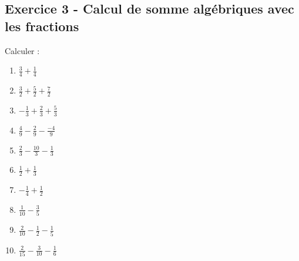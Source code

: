 \documentclass[14 pt]{extarticle}
\renewcommand\it\item
\theoremstyle{plain}
\begin{document}
   
  
  \subsection*{Exercice 3 - Calcul de somme algébriques avec les fractions}
  Calculer : 
  \begin{enumerate}
  \item $\displaystyle\frac34 + \frac14$
  \item $\displaystyle\frac32 + \frac52 + \frac72$
  \it $\displaystyle-\frac13 + \frac23 + \frac53$
  \it $\displaystyle\frac49 - \frac29 - \frac{-4}9$
  \it $\displaystyle\frac23 - \frac{10}3 - \frac{1}3$
  \it $\displaystyle\frac12 + \frac13$
  \it $\displaystyle-\frac14 + \frac12$
  \it $\displaystyle\frac1{10} - \frac35$
  \it $\displaystyle\frac2{10} - \frac12 - \frac15$
  \it $\displaystyle\frac2{15} - \frac3{10} - \frac16$
  \end{enumerate} 
  
  
  
  
  
 	
\end{document}
